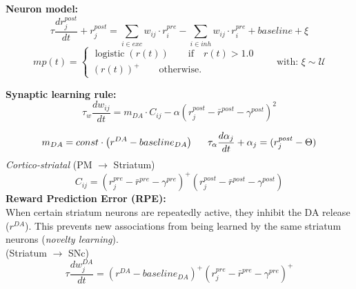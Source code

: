\documentclass[portrait,final,a0paper,fontscale=0.374]{baposter}
\begin{document}
\begin{poster}
{\begin{adjustbox}{minipage=0.95\textwidth, margin=5pt, center}
\begin{minipage}[r]{0.475\textwidth}
		\textbf{Neuron model:}\\
		$$
		\tau \frac{d r^{post}_j }{ dt } + r^{post}_j = \sum_{i \in exc}{w_{ij} \cdot r^{pre}_i} - \sum_{i \in inh}{w_{ij} \cdot r^{pre}_i} + baseline + \xi 
		$$
		$${mp}(t) = \begin{cases}\operatorname{logistic}{\left({r}(t) \right)}\qquad \text{if} \quad {r}(t) > 1.0\\ ({r}(t))^+ \qquad \text{otherwise.} \end{cases} \hspace{2em} \text{with:  } \xi \sim \mathcal{U}$$
		
		
		\textbf{Synaptic learning rule:}\\
		$$\tau_w \frac{d w_{ij} }{ dt } = m_{DA} \cdot C_{ij} - \alpha \left(r^{post}_j - \bar{r}^{post} - \gamma^{post}\right)^2$$
		\end{minipage}
		\hfill
		\begin{minipage}[r]{0.475\textwidth}
		\justifying
		$$m_{DA} = const \cdot \left(r^{DA} - baseline_{DA}\right) \hspace{1.5em} \tau_{\alpha} \frac{d \alpha_j }{ dt } + \alpha_j = (r^{post}_j - \Theta)$$
		\textit{Cortico-striatal} (PM $\rightarrow$ Striatum)
		$$ C_{ij} = \left(r^{pre}_j - \bar{r}^{pre} - \gamma^{pre}\right)^+ \left(r^{post}_j - \bar{r}^{post} - \gamma^{post}\right) $$	
		\textbf{Reward Prediction Error (RPE):}\\[5pt]
			When certain striatum neurons are repeatedly active, they inhibit the DA release ($r^{DA}$). 
			This prevents new associations from being learned by the same striatum neurons (\textit{novelty learning}).\\
			(Striatum $\rightarrow$ SNc)
			$$ \tau \frac{d w_{j}^{DA}}{dt} =  \left(r^{DA} - baseline_{DA}\right)^+ \left( r^{pre}_j - \bar{r}^{pre} - \gamma^{pre}\right)^+ $$
		\end{minipage}
	\end{adjustbox}
}



\end{poster}
\end{document}
